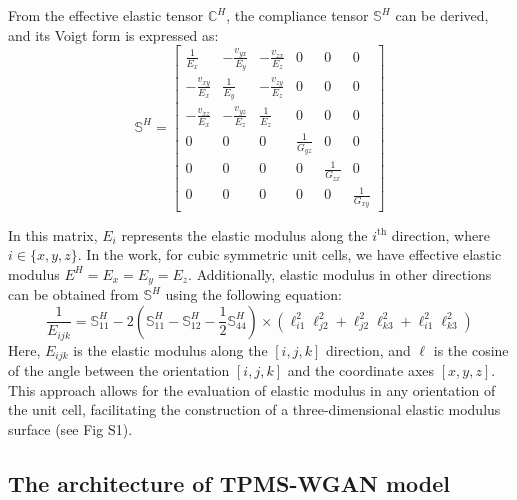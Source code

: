 \documentclass[preprint,review,12pt,authoryear]{elsarticle}
\begin{document}
From the effective elastic tensor $\mathbb{C}^H$, the compliance tensor $\mathbb{S}^H$ can be derived, and its Voigt form is expressed as:
\begin{equation}
\mathbb{S}^H = \begin{bmatrix}
\frac{1}{E_x} & -\frac{v_{yx}}{E_y} & -\frac{v_{zx}}{E_z} & 0 & 0 & 0 \\
-\frac{v_{xy}}{E_x} & \frac{1}{E_y} & -\frac{v_{zy}}{E_z} & 0 & 0 & 0 \\
-\frac{v_{xz}}{E_x} & -\frac{v_{yz}}{E_z} & \frac{1}{E_z} & 0 & 0 & 0 \\
0 & 0 & 0 & \frac{1}{G_{yz}} & 0 & 0 \\
0 & 0 & 0 & 0 & \frac{1}{G_{zx}} & 0 \\
0 & 0 & 0 & 0 & 0 & \frac{1}{G_{xy}}
\end{bmatrix}
\label{eq:5}
\end{equation}

In this matrix, $E_i$ represents the elastic modulus along the $i^{\text{th}}$ direction, where $i \in \{x, y, z\}$. In the work, for cubic symmetric unit cells, we have effective elastic modulus $E^H=E_x=E_y=E_z$. Additionally, elastic modulus in other directions can be obtained from $\mathbb{S}^H$ using the following equation:
\begin{equation}
\frac{1}{E_{ijk}} = \mathbb{S}^H_{11} - 2 \left(\mathbb{S}^H_{11} - \mathbb{S}^H_{12} - \frac{1}{2} \mathbb{S}^H_{44} \right) \times \left( \ell_{i1}^2 \ell_{j2}^2 + \ell_{j2}^2 \ell_{k3}^2 + \ell_{i1}^2 \ell_{k3}^2 \right)
    \label{eq:6}
\end{equation}
Here, $E_{ijk}$ is the elastic modulus along the $[i,j,k]$ direction, and $\ell$ is the cosine of the angle between the orientation $[i,j,k]$ and the coordinate axes $[x, y, z]$. This approach allows for the evaluation of elastic modulus in any orientation of the unit cell, facilitating the construction of a three-dimensional elastic modulus surface (see Fig S1).

\subsection{The architecture of TPMS-WGAN model}
\end{document}
